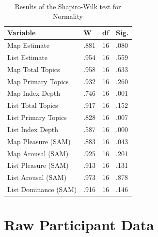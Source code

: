 \begin{table}[htbp!]
\centering
\caption{Results of the Shapiro-Wilk test for Normality}\vspace{0.3cm}
\label{res:sw}
\begin{tabular}{|llll|}
\hline
Variable                             & W    & df & Sig. \\ \hline\hline
Map Estimate                         & .881 & 16 & .080 \\
List Estimate                        & .954 & 16 & .559 \\
Map Total Topics                     & .958 & 16 & .633 \\
Map Primary Topics                   & .932 & 16 & .260 \\
Map Index Depth                      & .746 & 16 & .001 \\
List Total Topics                    & .917 & 16 & .152 \\
List Primary Topics                  & .828 & 16 & .007 \\
List Index Depth                     & .587 & 16 & .000 \\
Map Pleasure (SAM)                   & .883 & 16 & .043 \\
Map Arousal (SAM)                    & .925 & 16 & .201 \\
List Pleasure (SAM)                  & .913 & 16 & .131 \\
List Arousal (SAM)                   & .973 & 16 & .878 \\
List Dominance (SAM)                 & .916 & 16 & .146 \\
\hline
\end{tabular}
\end{table}
\vspace{1cm}

\section{Raw Participant Data} \label{sec:evalraw}

